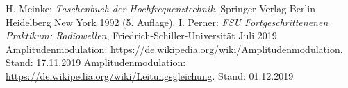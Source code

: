\documentclass[a4paper,twoside,final]{article}
\begin{document}

\begin{thebibliography}{xxx}
	H. Meinke: \textit{Taschenbuch der Hochfrequenztechnik}. Springer Verlag Berlin Heidelberg New York 1992 (5. Auflage).
  I. Perner: \textit{FSU Fortgeschrittenenen Praktikum: Radiowellen}, Fried\-rich-Schil\-ler-Uni\-versi\-tät Juli 2019
  Amplitudenmodulation: \url{https://de.wikipedia.org/wiki/Amplitudenmodulation}. Stand: 17.11.2019
  Amplitudenmodulation: \url{https://de.wikipedia.org/wiki/Leitungsgleichung}. Stand: 01.12.2019
\end{thebibliography}
\end{document}
